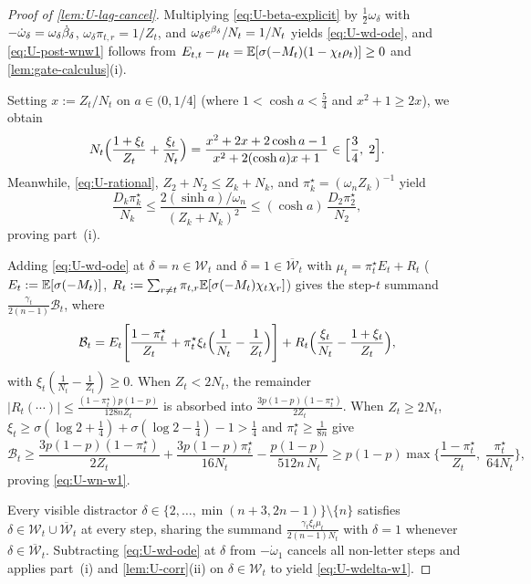 \begin{proof}[Proof of \cref{lem:U-lag-cancel}]
Multiplying \cref{eq:U-beta-explicit} by $\frac{1}{2}\omega_\delta$ with $-\dot\omega_\delta = \omega_\delta\dot{\beta}_\delta$, $\omega_\delta\pi_{t,r} = 1/Z_t$, and $\omega_\delta e^{\beta_\delta}/N_t = 1/N_t$ yields \cref{eq:U-wd-ode}, and \cref{eq:U-post-wnw1} follows from $E_{t,t} - \mu_t = \mathbb E[\sigma(-M_t)(1 - \chi_t\rho_t)] \ge 0$ and \cref{lem:gate-calculus}(i).

Setting $x := Z_t/N_t$ on $a \in (0, 1/4]$ (where $1 < \cosh a < \frac{5}{4}$ and $x^2 + 1 \ge 2x$), we obtain
\[
  N_t\Bigl(\frac{1+\xi_t}{Z_t} + \frac{\xi_t}{N_t}\Bigr)
  = \frac{x^2 + 2x + 2\cosh a - 1}{x^2 + 2(\cosh a)x + 1} \in \Bigl[\frac{3}{4},\; 2\Bigr].
\]
Meanwhile, \cref{eq:U-rational}, $Z_2 + N_2 \le Z_k + N_k$, and $\pi_k^\star = (\omega_n Z_k)^{-1}$ yield
\[
  \frac{D_k\pi_k^\star}{N_k}
  \le \frac{2(\sinh a)/\omega_n}{(Z_k + N_k)^2}
  \le (\cosh a)\,\frac{D_2\pi_2^\star}{N_2},
\]
proving part~(i).

Adding \cref{eq:U-wd-ode} at $\delta = n \in \mathcal W_t$ and $\delta = 1 \in \overline{\mathcal W}_t$ with $\mu_t = \pi_t^\star E_t + R_t$ ($E_t := \mathbb E[\sigma(-M_t)]$, $R_t := \sum_{r\ne t}\pi_{t,r}\mathbb E[\sigma(-M_t)\chi_t\chi_r]$) gives the step-$t$ summand $\frac{\gamma_t}{2(n-1)}\mathcal B_t$, where
\[
  \mathcal B_t = E_t\Biggl[\frac{1-\pi_t^\star}{Z_t} + \pi_t^\star\xi_t\Bigl(\frac{1}{N_t} - \frac{1}{Z_t}\Bigr)\Biggr]
  + R_t\Bigl(\frac{\xi_t}{N_t} - \frac{1+\xi_t}{Z_t}\Bigr),
\]
with $\xi_t(\frac{1}{N_t} - \frac{1}{Z_t}) \ge 0$. When $Z_t < 2N_t$, the remainder $|R_t(\cdots)| \le \frac{(1-\pi_t^\star)p(1-p)}{128n Z_t}$ is absorbed into $\frac{3p(1-p)(1-\pi_t^\star)}{2Z_t}$. When $Z_t \ge 2N_t$, $\xi_t \ge \sigma(\log 2 + \frac{1}{4}) + \sigma(\log 2 - \frac{1}{4}) - 1 > \frac{1}{4}$ and $\pi_t^\star \ge \frac{1}{8n}$ give
\[
  \mathcal B_t
  \ge \frac{3p(1-p)(1-\pi_t^\star)}{2Z_t} + \frac{3p(1-p)\pi_t^\star}{16N_t} - \frac{p(1-p)}{512n\,N_t}
  \ge p(1-p)\max\Biggl\{\frac{1-\pi_t^\star}{Z_t},\; \frac{\pi_t^\star}{64N_t}\Biggr\},
\]
proving \cref{eq:U-wn-w1}.

Every visible distractor $\delta \in \{2,\ldots,\min(n+3, 2n-1)\}\setminus\{n\}$ satisfies $\delta \in \mathcal W_t \cup \overline{\mathcal W}_t$ at every step, sharing the summand $\frac{\gamma_t\xi_t\mu_t}{2(n-1)N_t}$ with $\delta = 1$ whenever $\delta \in \overline{\mathcal W}_t$. Subtracting \cref{eq:U-wd-ode} at $\delta$ from $-\dot\omega_1$ cancels all non-letter steps and applies part~(i) and \cref{lem:U-corr}(ii) on $\delta \in \mathcal W_t$ to yield \cref{eq:U-wdelta-w1}.
\end{proof}

